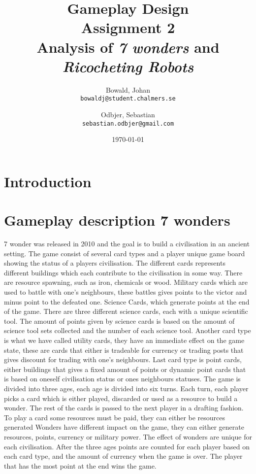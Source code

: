 \documentclass[a4paper]{article}
\title{Gameplay Design \\ Assignment 2 \\ Analysis of \textit{7 wonders} and \textit{Ricocheting Robots} }
\author{
  Bowald, Johan\\
  \texttt{bowaldj@student.chalmers.se}
  \and
  Odbjer, Sebastian\\
  \texttt{sebastian.odbjer@gmail.com}
}
\date{\today}
\begin{document}
\maketitle
\newpage
\tableofcontents{}
\newpage
\section{Introduction}

\section{Gameplay description 7 wonders}
\label{sec:what7wond}
7 wonder was released in 2010 and the goal is to build a civilisation in an ancient setting. 
The game consist of several card types and a player unique game board showing the status of a players civilisation. The different cards represents different buildings which each contribute to the civilisation in some way. There are resource spawning, such as iron, chemicals or wood. Military cards which are used to battle with one's neighbours, these battles gives points to the victor and minus point to the defeated one. Science Cards, which generate points at the end of the game. There are three different science cards, each with a unique scientific tool. The amount of points given by science cards is based on the amount of science tool sets collected and the number of each science tool.
Another card type is what we have called utility cards, they have an immediate effect on the game state, these are cards that either is tradeable for currency or trading posts that gives discount for trading with one's neighbours. Last card type is point cards, either buildings that gives a fixed amount of points or dynamic point cards that is based on oneself civilisation status or ones neighbours statuses. The game is divided into three ages, each age is divided into six turns. Each turn, each player picks a card which is either played, discarded or used as a resource to build a wonder. The rest of the cards is passed to the next player in a drafting fashion. To play a card some resources must be paid, they can either be resources generated Wonders have different impact on the game, they can either generate resources, points, currency or military power. The effect of wonders are unique for each civilisation. After the three ages points are counted for each player based on each card type, and the amount of currency when the game is over. The player that has the most point at the end wins the game. 
\end{document}
